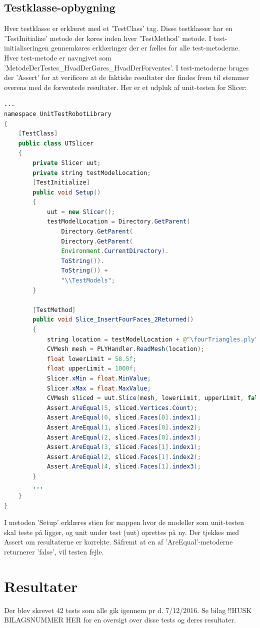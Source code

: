 \subsection{Testklasse-opbygning}
Hver testklasse er erklæret med et 'TestClass' tag. Disse testklasser har en 'TestInitialize' metode der køres inden hver 'TestMethod' metode. I test-initialiseringen gennemkøres erklæringer der er fælles for alle test-metoderne. Hver test-metode er navngivet som 'MetodeDerTestes\_HvadDerGøres\_HvadDerForventes'. I test-metoderne bruges der 'Assert' for at verificere at de faktiske resultater der findes frem til stemmer overens med de forventede resultater. Her er et udpluk af unit-testen for Slicer:
\begin{lstlisting}[language=Java]
...
namespace UnitTestRobotLibrary
{
	[TestClass]
	public class UTSlicer
	{
		private Slicer uut;
		private string testModelLocation;
		[TestInitialize]
		public void Setup()
		{
			uut = new Slicer();
			testModelLocation = Directory.GetParent(
				Directory.GetParent(
				Directory.GetParent(
				Environment.CurrentDirectory).
				ToString()).
				ToString()) +
				"\\TestModels";
		}

		[TestMethod]
		public void Slice_InsertFourFaces_2Returned()
		{
			string location = testModelLocation + @"\fourTriangles.ply";
			CVMesh mesh = PLYHandler.ReadMesh(location);
			float lowerLimit = 58.5f;
			float upperLimit = 1000f;
			Slicer.xMin = float.MinValue;
			Slicer.xMax = float.MaxValue;
			CVMesh sliced = uut.Slice(mesh, lowerLimit, upperLimit, false);
			Assert.AreEqual(5, sliced.Vertices.Count);
			Assert.AreEqual(0, sliced.Faces[0].index1);
			Assert.AreEqual(1, sliced.Faces[0].index2);
			Assert.AreEqual(2, sliced.Faces[0].index3);
			Assert.AreEqual(3, sliced.Faces[1].index1);
			Assert.AreEqual(2, sliced.Faces[1].index2);
			Assert.AreEqual(4, sliced.Faces[1].index3);
		}
		...
	}
}
\end{lstlisting}
I metoden 'Setup' erklæres stien for mappen hvor de modeller som unit-testen skal teste på ligger, og unit under test (uut) oprettes på ny. Der tjekkes med Assert om resultaterne er korrekte. Såfremt at en af 'AreEqual'-metoderne returnerer 'false', vil testen fejle.
\newpage
\section{Resultater}
Der blev skrevet 42 tests som alle gik igennem pr d. 7/12/2016.
Se bilag !!HUSK BILAGSNUMMER HER for en oversigt over disse tests og deres resultater.

